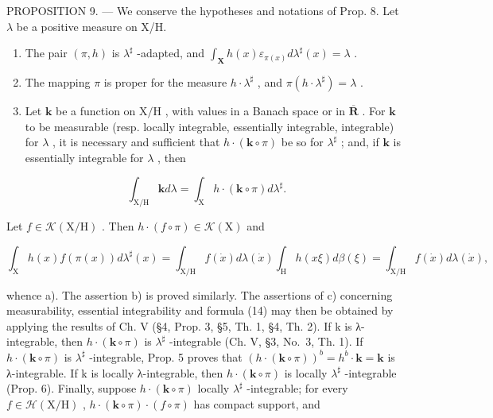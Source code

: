 PROPOSITION 9. --- We conserve the hypotheses and notations of Prop. 8. Let \(\lambda\) be a positive measure on X/H.

\begin{enumerate}
\def\labelenumi{\alph{enumi})}
\item
  The pair \((\pi, h)\) is \(\lambda^{\sharp}\) -adapted, and \(\int_{\mathbf{X}} h(x) \varepsilon_{\pi(x)} d\lambda^{\sharp}(x) = \lambda\) .
\item
  The mapping \(\pi\) is proper for the measure \(h\cdot \lambda^{\sharp}\) , and \(\pi (h\cdot \lambda^{\sharp}) = \lambda\) .
\item
  Let \(\mathbf{k}\) be a function on \(\mathrm{X / H}\) , with values in a Banach space or in \(\overline{\mathbf{R}}\) . For \(\mathbf{k}\) to be measurable (resp. locally integrable, essentially integrable, integrable) for \(\lambda\) , it is necessary and sufficient that \(h\cdot (\mathbf{k}\circ \pi)\) be so for \(\lambda^{\sharp}\) ; and, if \(\mathbf{k}\) is essentially integrable for \(\lambda\) , then
\end{enumerate}

\[
\int_ {\mathrm{X} / \mathrm{H}} \mathbf {k} d \lambda = \int_ {\mathrm{X}} h \cdot (\mathbf {k} \circ \pi) d \lambda^ {\sharp}.\tag{14}
\]

Let \(f \in \mathcal{K}(\mathrm{X}/\mathrm{H})\) . Then \(h \cdot (f \circ \pi) \in \mathcal{K}(\mathrm{X})\) and

\[
\int_ {\mathrm{X}} h (x) f (\pi (x)) d \lambda^ {\sharp} (x) = \int_ {\mathrm{X} / \mathrm{H}} f (\dot {x}) d \lambda (\dot {x}) \int_ {\mathrm{H}} h (x \xi) d \beta (\xi) = \int_ {\mathrm{X} / \mathrm{H}} f (\dot {x}) d \lambda (\dot {x}),
\]

whence a). The assertion b) is proved similarly. The assertions of c) concerning measurability, essential integrability and formula (14) may then be obtained by applying the results of Ch. V (§4, Prop. 3, §5, Th. 1, §4, Th. 2). If k is λ-integrable, then \(h \cdot (\mathbf{k} \circ \pi)\) is \(\lambda^{\sharp}\) -integrable (Ch. V, §3, No.~3, Th. 1). If \(h \cdot (\mathbf{k} \circ \pi)\) is \(\lambda^{\sharp}\) -integrable, Prop. 5 proves that \((h \cdot (\mathbf{k} \circ \pi))^b = h^b \cdot \mathbf{k} = \mathbf{k}\) is λ-integrable. If k is locally λ-integrable, then \(h \cdot (\mathbf{k} \circ \pi)\) is locally \(\lambda^{\sharp}\) -integrable (Prop. 6). Finally, suppose \(h \cdot (\mathbf{k} \circ \pi)\) locally \(\lambda^{\sharp}\) -integrable; for every \(f \in \mathcal{H}(\mathrm{X}/\mathrm{H})\) , \(h \cdot (\mathbf{k} \circ \pi) \cdot (f \circ \pi)\) has compact support, and

